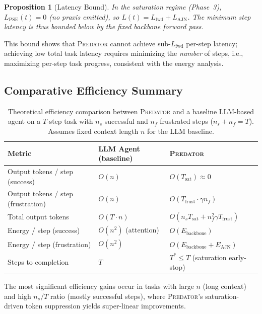 \documentclass[12pt,a4paper]{article}
\newtheorem{proposition}{Proposition}[section]
\newcommand{\PREDATOR}{\textsc{Predator}}
\begin{document}
\begin{proposition}[Latency Bound]
\label{prop:latency}
In the saturation regime (Phase~3), $L_{\text{PSE}}(t) = 0$ (no praxis
emitted), so $L(t) = L_{\text{fwd}} + L_{\text{AJN}}$. The minimum step
latency is thus bounded below by the fixed backbone forward pass.
\end{proposition}

This bound shows that \PREDATOR{} cannot achieve sub-$L_{\text{fwd}}$
per-step latency; achieving low total task latency requires minimizing the
\textit{number} of steps, i.e., maximizing per-step task progress, consistent
with the energy analysis.

\subsection{Comparative Efficiency Summary}

\begin{table}[h]
\centering
\caption{Theoretical efficiency comparison between \PREDATOR{} and a baseline
LLM-based agent on a $T$-step task with $n_s$ successful and $n_f$ frustrated
steps ($n_s + n_f = T$). Assumes fixed context length $n$ for the LLM baseline.}
\label{tab:efficiency}
\begin{tabular}{@{}lll@{}}
\toprule
\textbf{Metric} & \textbf{LLM Agent (baseline)} & \textbf{\PREDATOR{}}\\
\midrule
Output tokens / step (success) & $O(n)$ & $O(T_{\text{sat}}) \approx 0$\\
Output tokens / step (frustration) & $O(n)$ & $O(T_{\text{frust}} \cdot \gamma n_f)$\\
Total output tokens & $O(T \cdot n)$ & $O(n_s T_{\text{sat}} + n_f^2 \gamma T_{\text{frust}})$\\
Energy / step (success) & $O(n^2)$ (attention) & $O(E_{\text{backbone}})$\\
Energy / step (frustration) & $O(n^2)$ & $O(E_{\text{backbone}} + E_{\text{AJN}})$\\
Steps to completion & $T$ & $T^* \leq T$ (saturation early-stop)\\
\bottomrule
\end{tabular}
\end{table}

The most significant efficiency gains occur in tasks with large $n$ (long
context) and high $n_s/T$ ratio (mostly successful steps), where \PREDATOR's
saturation-driven token suppression yields super-linear improvements.
\end{document}
